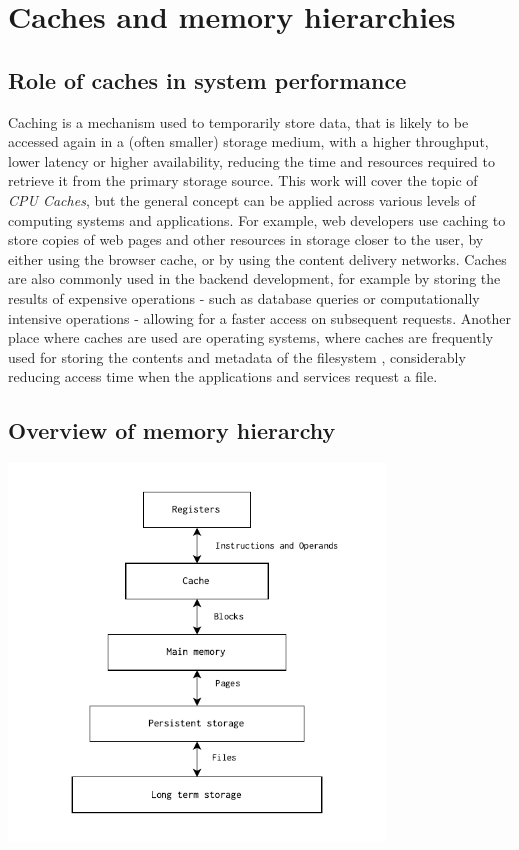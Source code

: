 \section{Caches and memory hierarchies}


\subsection{Role of caches in system performance}

Caching is a mechanism used to temporarily store data, that is likely to be accessed again in a (often smaller) storage medium, with a higher throughput, lower latency or higher availability,
reducing the time and resources required to retrieve it from the primary storage source. This work will cover the topic of \textit{CPU Caches}, but the general concept can be applied across
various levels of computing systems and applications.
For example, web developers use caching to store copies of web pages and other resources in storage closer to the user, by either using the browser cache, or by using the content delivery networks. %
Caches are also commonly used in the backend development, for example by storing the results of expensive operations - such as database queries or computationally intensive operations -
allowing for a faster access on subsequent requests. Another place where caches are used are operating systems, where caches are frequently used for storing the contents and metadata of %
the filesystem \cite{linuxfscache}, considerably reducing access time when the applications and services request a file.

\subsection{Overview of memory hierarchy} \label{sec:memhier}

\begin{center}
	\centering
	\includegraphics[width=0.75\textwidth]{figures/02-background/memhier.pdf}
	\label{fig:memhier}
\end{center}


